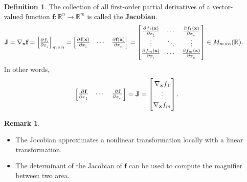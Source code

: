 \documentclass[12pt,openany]{book}
\theoremstyle{definition}
\newtheorem{definition}{Definition}[chapter]
\newtheorem{remark}{Remark}[chapter]
\newcommand{\R}{\mathbb{R}}
\newcommand{\of}[1]{\left( #1 \right)}
\newcommand{\by}{\times}
\renewcommand{\vec}[1]{\textbf{#1}}
\begin{document}
\begin{tcolorbox}[colframe=defcolor,title={\color{white}\bf Jacobian}]
	\begin{definition}
		The collection of all first-order partial derivatives of a vector-valued function $\textbf{f}:\R^n\to\R^m$ is called the \textbf{Jacobian}.
		\begin{align*}
			\textbf{J}=\nabla_{\vec{x}}\vec{f}=
			\sbr{\pd{f_i}{x_i}}_{m\by n}&=\begin{bmatrix}
				\pd{\vec{f}\of{\vec{x}}}{x_1} &\cdots &
				\pd{\vec{f}\of{\vec{x}}}{x_n}
			\end{bmatrix}
			=\begin{bmatrix}
				\pd{f_1(\vec{x})}{x_1} & \cdots & \pd{f_1(\vec{x})}{x_n}\\
				\vdots&\ddots&\vdots\\
				\pd{f_m(\vec{x})}{x_1} & \cdots & \pd{f_m(\vec{x})}{x_n}
			\end{bmatrix}\in M_{m\by n}(\R).
		\end{align*} In other words, \[	
		\begin{bmatrix}
			\pd{\vec{f}}{x_1} & \cdots & \pd{\vec{f}}{x_n}
		\end{bmatrix}
			=\textbf{J}=
		\begin{bmatrix}
			\nabla_\textbf{x} f_1 \\ \vdots \\ \nabla_\textbf{x} f_m
		\end{bmatrix}.
		\]
	\end{definition}
\end{tcolorbox}
\begin{remark}
	\ \begin{itemize}
		\item 
		The Jocobian approximates a nonlinear transformation locally with a linear transformation.
		\item The determinant of the Jacobian of $\textbf{f}$ can be used to compute the magnifier
		between two area.
	\end{itemize}
\end{remark}
\newpage
\end{document}
